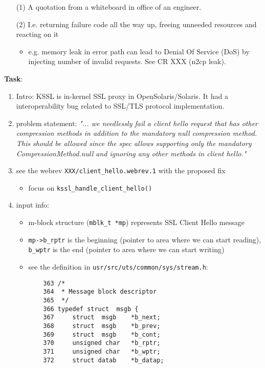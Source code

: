 \begin{itemize}
  \item[(1)] A quotation from a whiteboard in office of an engineer.
  \item[(2)] I.e. returning failure code all the way up, freeing unneeded
    resources and reacting on it
    \begin{itemize}
    \item e.g. memory leak in error path can lead to Denial Of Service (DoS) by
      injecting number of invalid requests. See CR XXX (n2cp leak).
    \end{itemize}
\end{itemize}

{\bf Task}:
\begin{enumerate}
  \item Intro: KSSL is in-kernel SSL proxy in OpenSolaris/Solaris. It had a
    interoperability bug related to SSL/TLS protocol implementation.
  \item problem statement: {\it "... we needlessly fail a client hello request
        that has other compression methods in addition to the mandatory null
        compression method. This should be allowed since the spec allows
        supporting only the mandatory CompressionMethod.null and ignoring
        any other methods in client hello."}
  \item see the webrev \texttt{XXX/client\_hello.webrev.1} with
    the proposed fix
    \begin{itemize}
    \item focus on \texttt{kssl\_handle\_client\_hello()}
    \end{itemize}
  \item input info:
     \begin{itemize}
     \item m-block structure (\texttt{mblk\_t *mp}) represents SSL Client
     Hello message
     \item \texttt{mp->b\_rptr} is the beginning (pointer to area where we
     can start reading), \texttt{b\_wptr} is the end (pointer to area
     where we can start writing)
     \item see the definition in \texttt{usr/src/uts/common/sys/stream.h}:
\begin{verbatim}
    363 /*
    364  * Message block descriptor
    365  */
    366 typedef struct	msgb {
    367 	struct	msgb	*b_next;
    368 	struct  msgb	*b_prev;
    369 	struct	msgb	*b_cont;
    370 	unsigned char	*b_rptr;
    371 	unsigned char	*b_wptr;
    372 	struct datab 	*b_datap;

\end{verbatim}
\end{itemize}
\end{enumerate}
